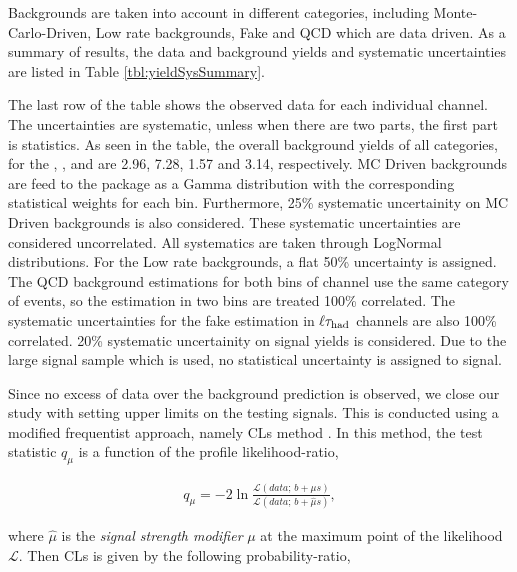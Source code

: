 Backgrounds are taken into account in different categories, including Monte-Carlo-Driven, Low rate backgrounds, Fake and QCD which are data driven.
As a summary of results, the data and background yields and systematic uncertainties are listed in Table \ref{tbl:yieldSysSummary}. 

The last row of the table shows the observed data for  each individual channel.  The uncertainties are systematic, unless when there are 
two parts, the first part is statistics.
As seen in the table, the overall background yields of all categories, 
for the \eTau, \muTau, \tauTau \binone and \bintwo are  
2.96, 7.28, 1.57 and 3.14, respectively.
MC Driven backgrounds are feed to the package as a Gamma distribution with the corresponding statistical weights for each bin.
Furthermore, 25\% systematic uncertainity on MC Driven backgrounds is also considered. These systematic uncertainties are considered uncorrelated.
All systematics are taken through LogNormal distributions. For the Low rate backgrounds, a flat 50\% uncertainty is assigned.
The QCD background estimations for 
both bins of \tauTau channel use the same category of events, so the estimation in two bins are treated 100\% correlated. 
The systematic uncertainties for the fake estimation in $\ell\tau_{\rm had}$ channels are also 100\% correlated. 
20\% systematic uncertainity on signal yields is considered. 
Due to the large signal sample which is used, no statistical uncertainty is assigned to signal.

Since no excess of data over the background prediction is observed, 
we close our study with setting upper limits on the testing signals.
This is conducted using a modified frequentist approach, namely CLs method \cite{read:CLs}.
In this method, the test statistic $q_\mu$ 
is a function of the profile likelihood-ratio,

\begin{align}
q_\mu = -2 \ln \frac{\mathcal{L}(data ;\, b + \mu s)}{\mathcal{L}(data ;\, b + \hat{\mu} s)},
\end{align}

where $\hat\mu$ is the \textit{signal strength modifier} $\mu$ at the maximum point of the likelihood $\mathcal{L}$.
Then CLs is given by the following probability-ratio,

